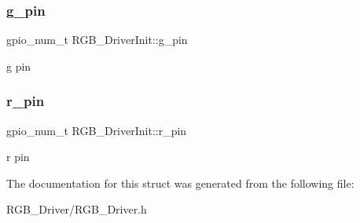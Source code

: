 \subsubsection{\texorpdfstring{g\+\_\+pin}{g\_pin}}
{\footnotesize\ttfamily gpio\+\_\+num\+\_\+t R\+G\+B\+\_\+\+Driver\+Init\+::g\+\_\+pin}

g pin \mbox{\label{structRGB__DriverInit_aa526026fc4e1d13ac66e4a013b117d98}} 
\subsubsection{\texorpdfstring{r\+\_\+pin}{r\_pin}}
{\footnotesize\ttfamily gpio\+\_\+num\+\_\+t R\+G\+B\+\_\+\+Driver\+Init\+::r\+\_\+pin}

r pin 

The documentation for this struct was generated from the following file\+:\begin{DoxyCompactItemize}
\item 
R\+G\+B\+\_\+\+Driver/R\+G\+B\+\_\+\+Driver.\+h\end{DoxyCompactItemize}

